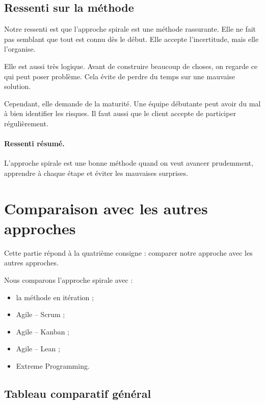 \documentclass[12pt,a4paper]{article}
\begin{document}
\subsection{Ressenti sur la méthode}

Notre ressenti est que l'approche spirale est une méthode rassurante. Elle ne fait pas semblant que tout est connu dès le début. Elle accepte l'incertitude, mais elle l'organise.

Elle est aussi très logique. Avant de construire beaucoup de choses, on regarde ce qui peut poser problème. Cela évite de perdre du temps sur une mauvaise solution.

Cependant, elle demande de la maturité. Une équipe débutante peut avoir du mal à bien identifier les risques. Il faut aussi que le client accepte de participer régulièrement.

\paragraph{Ressenti résumé.}
L'approche spirale est une bonne méthode quand on veut avancer prudemment, apprendre à chaque étape et éviter les mauvaises surprises.

\newpage

\section{Comparaison avec les autres approches}

Cette partie répond à la quatrième consigne : comparer notre approche avec les autres approches.

Nous comparons l'approche spirale avec :

\begin{itemize}
    \item la méthode en itération ;
    \item Agile -- Scrum ;
    \item Agile -- Kanban ;
    \item Agile -- Lean ;
    \item Extreme Programming.
\end{itemize}

\subsection{Tableau comparatif général}
\end{document}
